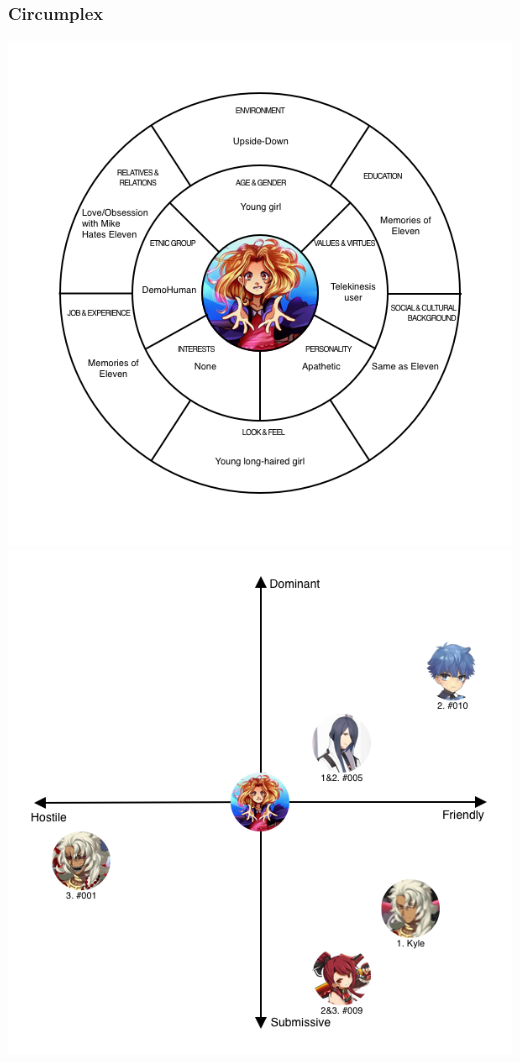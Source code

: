 \subsubsection{Circumplex}
\begin{center}
	\includegraphics[width=0.76\linewidth]{images/circumplex/bad_eleven_circumplex.png}
	\includegraphics[width=0.76\linewidth]{images/map_of_relations/bad_eleven_map_of_relations.png}
\end{center}

